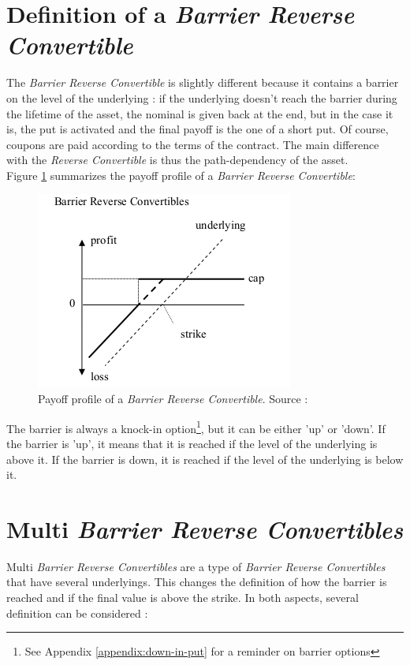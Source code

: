 \documentclass[a4paper,11pt,english]{book}
\begin{document}
\section{Definition of a \textit{Barrier Reverse Convertible}}
\label{sec:BRC-definition}

The \textit{Barrier Reverse Convertible} is slightly different because it contains a barrier on the level of the underlying : if the underlying doesn't reach the barrier during the lifetime of the asset, the nominal is given back at the end, but in the case it is, the put is activated and the final payoff is the one of a short put. Of course, coupons are paid according to the terms of the contract. The main difference with the \textit{Reverse Convertible} is thus the path-dependency of the asset. \\

Figure \ref{fig:BRC-payoff} summarizes the payoff profile of a \textit{Barrier Reverse Convertible}:

\begin{figure}[!h]
    \centering
    \includegraphics[scale=0.65]{images/BRC.png}
    \caption{Payoff profile of a \textit{Barrier Reverse Convertible}. Source : \cite{lindauer2008pricing}}
    \label{fig:BRC-payoff}
\end{figure}

The barrier is always a knock-in option\footnote{See Appendix \ref{appendix:down-in-put} for a reminder on barrier options}, but it can be either 'up' or 'down'. If the barrier is 'up', it means that it is reached if the level of the underlying is above it. If the barrier is down, it is reached if the level of the underlying is below it.

\section{Multi \textit{Barrier Reverse Convertibles}}
\label{sec:multi-BRC-definition}
Multi \textit{Barrier Reverse Convertibles} are a type of \textit{Barrier Reverse Convertibles} that have several underlyings. This changes the definition of how the barrier is reached and if the final value is above the strike. In both aspects, several definition can be considered :
\end{document}
